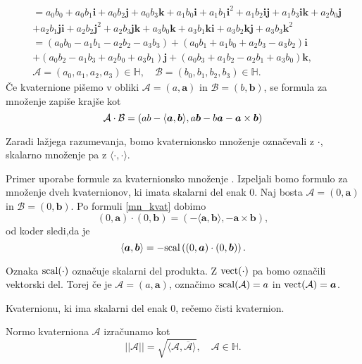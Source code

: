\documentclass[mat1]{fmfdelo}
\newcommand{\HH}{\mathbb H}
\newcommand{\ii}{\boldsymbol i}
\newcommand{\jj}{\boldsymbol j}
\newcommand{\kk}{\boldsymbol k}
\newcommand{\ba}{\boldsymbol a}
\newcommand{\bb}{\boldsymbol b}
\newcommand{\A}{\mathcal A}
\newcommand{\B}{\mathcal B}
\begin{document}
\begin{itemize}
\begin{equation*}
\begin{split}
&=a_0b_0+a_0b_1\ii+a_0b_2\jj+a_0b_3\kk+a_1b_0\ii+a_1b_1\ii^2+a_1b_2\ii\jj+a_1b_3\ii\kk+a_2b_0\jj\\
&+a_2b_1\jj\ii+a_2b_2\jj^2+a_2b_3\jj\kk+a_3b_0\kk+a_3b_1\kk\ii+a_3b_2\kk\jj+a_3b_3\kk^2\\
&=(a_0b_0-a_1b_1-a_2b_2-a_3b_3) +(a_0b_1+a_1b_0+a_2b_3-a_3b_2)\ii \\
&+(a_0b_2-a_1b_3+a_2b_0+a_3b_1)\jj +(a_0b_3+a_1b_2-a_2b_1+a_3b_0)\kk,\\
&\A = (a_0,a_1,a_2,a_3) \in \HH, \quad \B = (b_0,b_1,b_2,b_3) \in \HH.
\end{split}
\end{equation*}
Če kvaternione pišemo v obliki $\A=(a,\ba)$ in $\B=(b,\bb)$, se formula za množenje zapiše krajše kot
\begin{equation}{\label{mn_kvat}}
	\A \cdot \B = \left( ab-\langle \ba,\bb \rangle, a\bb-b\ba-\ba \times \bb\right)
\end{equation}
\end{itemize}
Zaradi lažjega razumevanja, bomo kvaternionsko množenje označevali z $\cdot$, skalarno množenje pa z $\langle\cdot,\cdot\rangle$.
\begin{primer}
	Primer uporabe formule za kvaternionsko množenje . Izpeljali bomo formulo za  množenje dveh kvaternionov, ki imata skalarni del enak 0.
	Naj bosta $\A = (0,\boldsymbol{a})$ in $\B=(0,\boldsymbol{b})$. Po formuli \ref{mn_kvat} dobimo
	\begin{equation*}
	(0,\boldsymbol{a}) \cdot (0,\boldsymbol{b}) = \left( -\langle \boldsymbol{a}, \boldsymbol{b} \rangle , -\boldsymbol{a} \times \boldsymbol{b} \right),
	\end{equation*}
	od koder sledi,da je
	\begin{equation}{\label{mn_kvat_0}}
	\langle \boldsymbol{a},\boldsymbol{b} \rangle = -{\rm scal}\left( (0,\boldsymbol{a}) \cdot (0,\boldsymbol{b}) \right).
	\end{equation}
\end{primer}
\begin{opomba}
	Oznaka ${\rm scal}(\cdot)$ označuje skalarni del produkta. Z ${\rm vect}(\cdot)$ pa bomo označili vektorski del. Torej če je $\A = (a,\ba)$, označimo ${\rm scal}(\A) = a$ in ${\rm vect}(\A)=\ba$.
\end{opomba}
\begin{opomba}
	Kvaternionu, ki ima skalarni del enak 0, rečemo čisti kvaternion.
\end{opomba}
Normo kvaterniona $\A$ izračunamo kot
\begin{equation*}
||\A|| = \sqrt{\langle \A, \overline{\A}\rangle}, \quad \A \in \HH.
\end{equation*}
\end{document}
